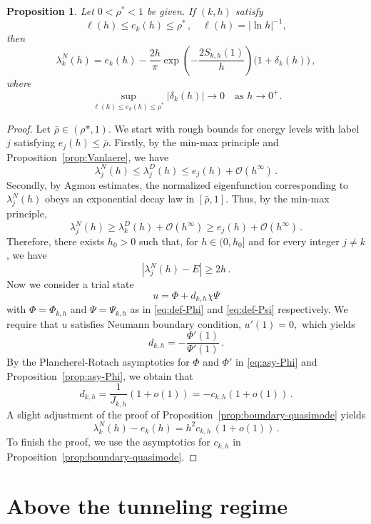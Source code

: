 \documentclass[11pt]{amsart}
\numberwithin{equation}{section}
\newtheorem{proposition}[theorem]{Proposition}
\theoremstyle{remark}
\begin{document}
\begin{proposition}\label{prop:Neumann}
Let $0<\rho^*<1$ be given. If $(k,h)$ satisfy
\[    \ell(h)\leq e_k(h)\leq \rho^*\,,\quad \ell(h)=|\ln h|^{-1},\]
then
%
\[\lambda_k^N(h)=e_k(h)- 
	\frac{2h}{\pi}
	\exp\!\left(-\frac{2S_{k,h}(1)}{h}\right)
	\bigl(1+\delta_k(h)\bigr)\,,
\]
%
where 
\[\sup_{\ell(h)\leq e_k(h)\leq \rho^*}|\delta_k(h)|\longrightarrow0\quad\text{as $h\longrightarrow0^+$}.\]
%
\end{proposition}
\begin{proof}

Let $\bar\rho\in(\rho*,1)$. We start with rough bounds for energy levels  with label $j$ satisfying $e_j(h)\leq \bar\rho$. Firstly, by the min-max principle and Proposition~\ref{prop:Vanlaere}, we have
\[\lambda^N_j(h)\leq \lambda_j^D(h)\leq e_j(h)+\mathcal O(h^\infty)\,.\]
Secondly, by Agmon estimates, the normalized eigenfunction corresponding to
$\lambda_j^N(h)$ obeys an exponential decay law in $[\bar\rho,1]$. Thus, by the min-max principle,
\[\lambda_j^N(h)\geq \lambda_k^D(h)+\mathcal O(h^\infty)\geq e_j(h)+\mathcal O(h^\infty)\,.\]
Therefore, there exists $h_0>0$ such that, for $h\in(0,h_0]$ and for every integer $j\not=k$, we have
\[|\lambda_j^N(h)-E|\geq 2h\,.\]
%
Now we consider a trial state
\[u=\Phi+d_{k,h}\chi\Psi\]
with $\Phi=\Phi_{k,h}$ and $\Psi=\Psi_{k,h}$ as in \eqref{eq:def-Phi} and \eqref{eq:def-Psi} respectively. We require that $u$ satisfies Neumann boundary condition, $u'(1)=0,$ which yields
\[d_{k,h}=-\frac{\Phi'(1)}{\Psi'(1)}\,.\]
By the Plancherel-Rotach asymptotics for $\Phi$ and $\Phi'$ in \eqref{eq:asy-Phi} and Proposition~\ref{prop:asy-Phi}, we obtain that
\[d_{k,h}=\frac{1}{J_{k,h}}\left(1+o(1)\right)=-c_{k,h}(1+o(1))\,.\]
A slight adjustment of the proof of Proposition~\ref{prop:boundary-quasimode} yields
\[\lambda_k^N(h)-e_k(h)=h^2c_{k,h}\, (1+o(1))\,.\]
To finish the proof, we use the asymptotics for $c_{k,h}$ in Proposition~\ref{prop:boundary-quasimode}.
\end{proof}
%
\section{Above the tunneling regime}\label{s3}
\end{document}
